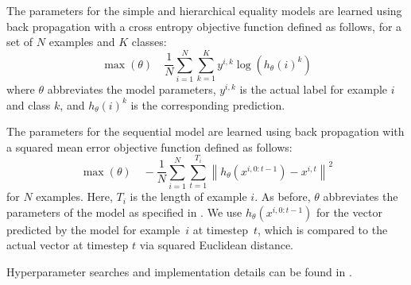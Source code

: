 {The parameters for the simple and hierarchical equality models are learned using back propagation with a cross entropy objective function defined as follows, for a set of $N$ examples and $K$ classes:
%
\begin{equation}\label{eq:crossent}
\max(\theta)
\quad
\frac{1}{N}
\sum_{i=1}^{N}
\sum_{k=1}^{K}
y^{i,k} \log(h_{\theta}(i)^{k})
\end{equation}
%
where $\theta$ abbreviates the model parameters, $y^{i,k}$ is the actual label for example $i$ and class $k$, and $h_{\theta}(i)^{k}$ is the corresponding prediction.

The parameters for the sequential model are learned using back propagation with a squared mean error objective function defined as follows:
%
\begin{equation}
\max(\theta)
\quad
-\frac{1}{N}
\sum_{i=1}^{N}
\sum_{t=1}^{T_{i}}
\left\| h_{\theta}\left(x^{i, 0:{t-1}}\right) - x^{i,t} \right\|^{2}
\end{equation}
%
for $N$ examples. Here, $T_{i}$ is the length of example $i$. As before, $\theta$ abbreviates the parameters of the model as specified in . We use $h_{\theta}(x^{i, 0:{t-1}})$ for the vector predicted by the model for example~$i$ at timestep~$t$, which is compared to the actual vector at timestep $t$ via squared Euclidean distance.

Hyperparameter searches and implementation details can be found in .

}

\showmatmethods{} %

\acknow{}

\showacknow{} %






